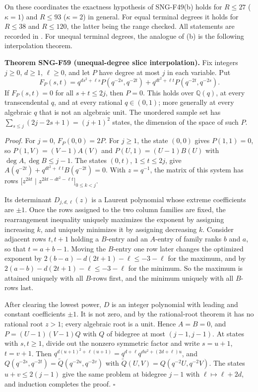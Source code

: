 \documentclass[
  11pt,
  a4paper,
]{report}
\let\singularitytexttt\texttt
\renewcommand{\texttt}[1]{\singularitytexttt{\seqsplit{#1}}}
\begin{document}
On these coordinates the exactness hypothesis of SNG-F49(b) holds for
\(R\le27\) (\(\kappa=1\)) and \(R\le93\) (\(\kappa=2\)) in general. For
equal terminal degrees it holds for \(R\le38\) and \(R\le120\), the
latter being the range checked. All statements are recorded in
\texttt{results/symmetric\_contexts.json}. For unequal terminal degrees,
the analogue of (b) is the following interpolation theorem.

\textbf{Theorem SNG-F59 (unequal-degree slice interpolation).} Fix
integers \(j\ge0\), \(d\ge1\), \(\ell\ge0\), and let \(P\) have degree
at most \(j\) in each variable. Put \[
F_P(s,t)=q^{ds^2+\ell s}P(q^{-2s},q^{-2t})+q^{dt^2+\ell t}P(q^{-2t},q^{-2s}).
\] If \(F_P(s,t)=0\) for all \(s+t\le2j\), then \(P=0\). This holds over
\(\mathbb Q(q)\), at every transcendental \(q\), and at every rational
\(q\in(0,1)\); more generally at every algebraic \(q\) that is not an
algebraic unit. The unordered sample set has
\(\sum_{s\le j}(2j-2s+1)=(j+1)^2\) states, the dimension of the space of
such \(P\).

\emph{Proof.} For \(j=0\), \(F_P(0,0)=2P\). For \(j\ge1\), the state
\((0,0)\) gives \(P(1,1)=0\), so \(P(1,V)=(V-1)A(V)\) and
\(P(U,1)=(U-1)B(U)\) with \(\deg A,\deg B\le j-1\). The states
\((0,t)\), \(1\le t\le2j\), give
\(A(q^{-2t})+q^{dt^2+\ell t}B(q^{-2t})=0\). With \(z=q^{-1}\), the
matrix of this system has rows
\(\bigl[z^{2kt}\mid z^{2kt-dt^2-\ell t}\bigr]_{0\le k<j}\).

Its determinant \(D_{j,d,\ell}(z)\) is a Laurent polynomial whose
extreme coefficients are \(\pm1\). Once the rows assigned to the two
column families are fixed, the rearrangement inequality uniquely
maximizes the exponent by assigning increasing \(k\), and uniquely
minimizes it by assigning decreasing \(k\). Consider adjacent rows
\(t,t+1\) holding a \(B\)-entry and an \(A\)-entry of family ranks \(b\)
and \(a\), so that \(t=a+b-1\). Moving the \(B\)-entry one row later
changes the optimized exponent by \(2(b-a)-d(2t+1)-\ell\le-3-\ell\) for
the maximum, and by \(2(a-b)-d(2t+1)-\ell\le-3-\ell\) for the minimum.
So the maximum is attained uniquely with all \(B\)-rows first, and the
minimum uniquely with all \(B\)-rows last.

After clearing the lowest power, \(D\) is an integer polynomial with
leading and constant coefficients \(\pm1\). It is not zero, and by the
rational-root theorem it has no rational root \(z>1\); every algebraic
root is a unit. Hence \(A=B=0\), and \(P=(U-1)(V-1)Q\) with \(Q\) of
bidegree at most \((j-1,j-1)\). At states with \(s,t\ge1\), divide out
the nonzero symmetric factor and write \(s=u+1\), \(t=v+1\). Then
\(q^{d(u+1)^2+\ell(u+1)}=q^{d+\ell}q^{du^2+(2d+\ell)u}\), and
\(Q(q^{-2s},q^{-2t})=\widetilde Q(q^{-2u},q^{-2v})\) with
\(\widetilde Q(U,V)=Q(q^{-2}U,q^{-2}V)\). The states \(u+v\le2(j-1)\)
give the same problem at bidegree \(j-1\) with \(\ell\mapsto\ell+2d\),
and induction completes the proof. \(\square\)
\end{document}
